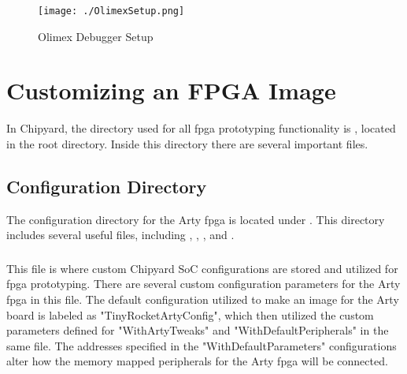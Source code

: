 \begin{figure}[h!tbp]
  \centering
  \texttt{[image: ./OlimexSetup.png]}
  \caption{Olimex Debugger Setup~\cite[p.~5]{FreedomDevGuide}}
  \label{fig:olimexsetup}
\end{figure}

\section{Customizing an FPGA Image}\label{sec:Customizing}
In Chipyard, the directory used for all \Gls{fpga} prototyping functionality is , located in the root directory.
Inside this directory there are several important files.


\subsection{Configuration Directory}\label{sec:Customizing_FPGA-Config_Directory}
The configuration directory for the Arty \Gls{fpga} is located under .
This directory includes several useful files, including , , , and .

\subsubsection{}\label{sec:Customizing_FPGA-Configs.scala}
This file is where custom Chipyard SoC configurations are stored and utilized for \Gls{fpga} prototyping. There are several custom configuration parameters for the Arty \Gls{fpga} in this file. 
The default configuration utilized to make an image for the Arty board is labeled as "TinyRocketArtyConfig", which then utilized the custom parameters defined for "WithArtyTweaks" and "WithDefaultPeripherals" in the same file. 
The addresses specified in the "WithDefaultParameters" configurations alter how the memory mapped peripherals for the Arty \Gls{fpga} will be connected.

